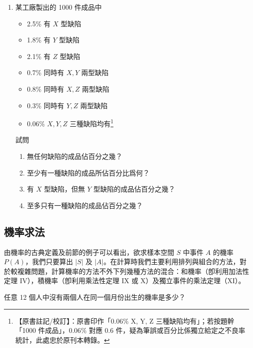 \begin{enumerate}[label=\textbf{\arabic*.}]
  \item 某工廠製出的 1000 件成品中
  \begin{itemize}[leftmargin=2.5em, itemsep=0.1em]
    \item[] 2.5\% 有 $X$ 型缺陷
    \item[] 1.8\% 有 $Y$ 型缺陷
    \item[] 2.1\% 有 $Z$ 型缺陷
    \item[] 0.7\% 同時有 $X, Y$ 兩型缺陷
    \item[] 0.8\% 同時有 $X, Z$ 兩型缺陷
    \item[] 0.3\% 同時有 $Y, Z$ 兩型缺陷
    \item[] 0.06\% $X, Y, Z$ 三種缺陷均有\label{note:b5-ch3-p105-q6}\footnote{【原書註記/校訂】：原書印作「0.06\% X, Y, Z 三種缺陷均有」；若按題幹「1000 件成品」，$0.06\%$ 對應 0.6 件，疑為筆誤或百分比係獨立給定之不良率統計，此處忠於原刊本轉錄。}
  \end{itemize}
  試問
  \begin{enumerate}[label=(\arabic*)]
    \item 無任何缺陷的成品佔百分之幾？
    \item 至少有一種缺陷的成品所佔百分比爲何？
    \item 有 $X$ 型缺陷，但無 $Y$ 型缺陷的成品佔百分之幾？
    \item 至多只有一種缺陷的成品佔百分之幾？
  \end{enumerate}
\end{enumerate}

\subsection{機率求法}\label{sec:b5-3-2}

由機率的古典定義及前節的例子可以看出，欲求樣本空間 $S$ 中事件 $A$ 的機率 $P(A)$，我們只要算出 $|S|$ 及 $|A|$。在計算時我們主要利用排列與組合的方法，對於較複雜問題，計算機率的方法不外下列幾種方法的混合：和機率（卽利用加法性定理 $\mathrm{IV}$），積機率（卽利用乘法性定理 $\mathrm{IX}$ 或 $\mathrm{X}$）及獨立事件的乘法定理（$\mathrm{XI}$）。

\vspace{1em}
\begin{example}\label{ex:b5-3-5}
任意 12 個人中沒有兩個人在同一個月份出生的機率是多少？
\end{example}
